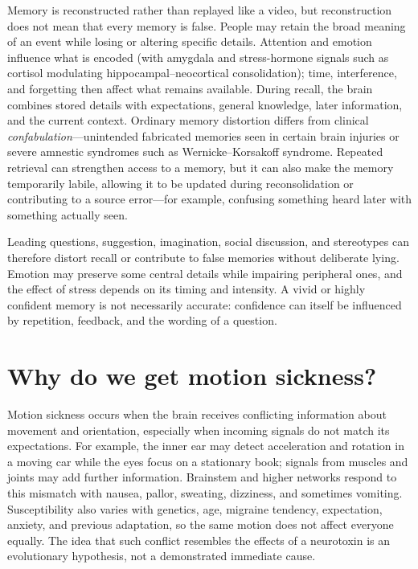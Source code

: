 \documentclass[11pt,oneside]{report}
\begin{document}
Memory is reconstructed rather than replayed like a video, but reconstruction
does not mean that every memory is false. People may retain the broad meaning
of an event while losing or altering specific details. Attention and emotion
influence what is encoded (with amygdala and stress-hormone signals such as
cortisol modulating hippocampal--neocortical consolidation); time, interference,
and forgetting then affect what remains available. During recall, the brain
combines stored details with expectations, general knowledge, later information,
and the current context. Ordinary memory distortion differs from clinical
\emph{confabulation}—unintended fabricated memories seen in certain brain
injuries or severe amnestic syndromes such as Wernicke--Korsakoff syndrome.
Repeated retrieval can strengthen access to a memory, but it can also make the
memory temporarily labile, allowing it to be updated during reconsolidation or
contributing to a source error---for example, confusing something heard later
with something actually seen.

Leading questions, suggestion, imagination, social discussion, and stereotypes
can therefore distort recall or contribute to false memories without deliberate
lying. Emotion may preserve some central details while impairing peripheral
ones, and the effect of stress depends on its timing and intensity. A vivid or
highly confident memory is not necessarily accurate: confidence can itself be
influenced by repetition, feedback, and the wording of a question.

\section{Why do we get motion sickness?}

Motion sickness occurs when the brain receives conflicting information about
movement and orientation, especially when incoming signals do not match its
expectations. For example, the inner ear may detect acceleration and rotation
in a moving car while the eyes focus on a stationary book; signals from muscles
and joints may add further information. Brainstem and higher networks respond
to this mismatch with nausea, pallor, sweating, dizziness, and sometimes
vomiting. Susceptibility also varies with genetics, age, migraine tendency,
expectation, anxiety, and previous adaptation, so the same motion does not affect
everyone equally. The idea that such conflict resembles the effects of a
neurotoxin is an evolutionary hypothesis, not a demonstrated immediate cause.
\end{document}
